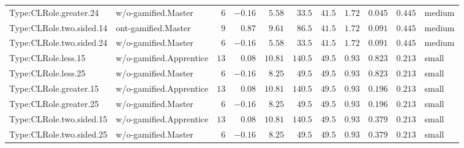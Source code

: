 \documentclass[6pt,a4paper]{article}
\begin{document}
{\begin{longtable}{llrrrrrrrrl}
Type:CLRole.greater.24&w/o-gamified.Master&$ 6$&$-0.16$&$ 5.58$&$ 33.5$&$ 41.5$&$ 1.72$&$0.045$&$0.445$&medium\tabularnewline
Type:CLRole.two.sided.14&ont-gamified.Master&$ 9$&$ 0.87$&$ 9.61$&$ 86.5$&$ 41.5$&$ 1.72$&$0.091$&$0.445$&medium\tabularnewline
Type:CLRole.two.sided.24&w/o-gamified.Master&$ 6$&$-0.16$&$ 5.58$&$ 33.5$&$ 41.5$&$ 1.72$&$0.091$&$0.445$&medium\tabularnewline
Type:CLRole.less.15&w/o-gamified.Apprentice&$13$&$ 0.08$&$10.81$&$140.5$&$ 49.5$&$ 0.93$&$0.823$&$0.213$&small\tabularnewline
Type:CLRole.less.25&w/o-gamified.Master&$ 6$&$-0.16$&$ 8.25$&$ 49.5$&$ 49.5$&$ 0.93$&$0.823$&$0.213$&small\tabularnewline
Type:CLRole.greater.15&w/o-gamified.Apprentice&$13$&$ 0.08$&$10.81$&$140.5$&$ 49.5$&$ 0.93$&$0.196$&$0.213$&small\tabularnewline
Type:CLRole.greater.25&w/o-gamified.Master&$ 6$&$-0.16$&$ 8.25$&$ 49.5$&$ 49.5$&$ 0.93$&$0.196$&$0.213$&small\tabularnewline
\newpage
Type:CLRole.two.sided.15&w/o-gamified.Apprentice&$13$&$ 0.08$&$10.81$&$140.5$&$ 49.5$&$ 0.93$&$0.379$&$0.213$&small\tabularnewline
Type:CLRole.two.sided.25&w/o-gamified.Master&$ 6$&$-0.16$&$ 8.25$&$ 49.5$&$ 49.5$&$ 0.93$&$0.379$&$0.213$&small\tabularnewline
\hline
\end{longtable}}
\end{document}
